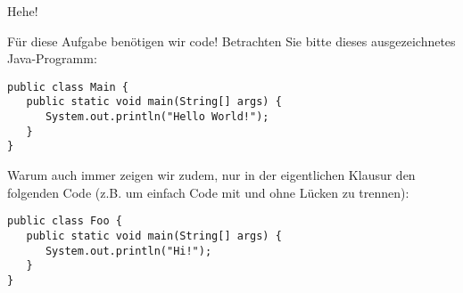 \begin{Exercise}[5]{Hehe!}
\label{ex:second}%

Für diese Aufgabe benötigen wir code!
Betrachten Sie bitte dieses ausgezeichnetes Java-Programm:

\begin{verbatim}
public class Main {
   public static void main(String[] args) {
      System.out.println("Hello World!");
   }
}
\end{verbatim}

Warum auch immer zeigen wir zudem, nur in der eigentlichen Klausur den folgenden Code (z.B. um einfach Code mit und ohne Lücken zu trennen):
\begin{verbatim}
public class Foo {
   public static void main(String[] args) {
      System.out.println("Hi!");
   }
}
\end{verbatim}
\fi

\end{Exercise}
